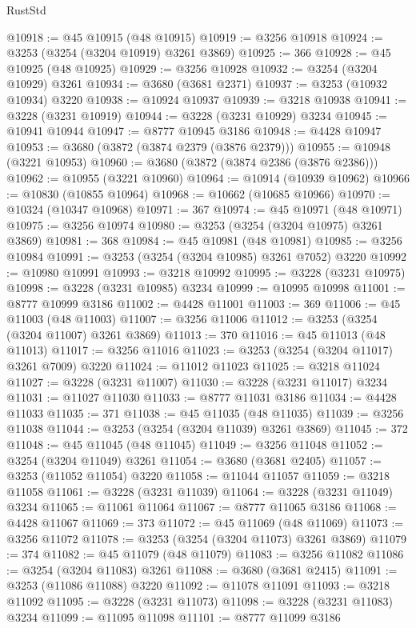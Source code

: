 \begin{lexlean}{RustStd}
\begin{coremodule}
@10918 := @45 @10915 (@48 @10915)
@10919 := @3256 @10918
@10924 := @3253 (@3254 (@3204 @10919) @3261 @3869)
@10925 := 366
@10928 := @45 @10925 (@48 @10925)
@10929 := @3256 @10928
@10932 := @3254 (@3204 @10929) @3261
@10934 := @3680 (@3681 @2371)
@10937 := @3253 (@10932 @10934) @3220
@10938 := @10924 @10937
@10939 := @3218 @10938
@10941 := @3228 (@3231 @10919)
@10944 := @3228 (@3231 @10929) @3234
@10945 := @10941 @10944
@10947 := @8777 @10945 @3186
@10948 := @4428 @10947
@10953 := @3680 (@3872 (@3874 @2379 (@3876 @2379)))
@10955 := @10948 (@3221 @10953)
@10960 := @3680 (@3872 (@3874 @2386 (@3876 @2386)))
@10962 := @10955 (@3221 @10960)
@10964 := @10914 (@10939 @10962)
@10966 := @10830 (@10855 @10964)
@10968 := @10662 (@10685 @10966)
@10970 := @10324 (@10347 @10968)
@10971 := 367
@10974 := @45 @10971 (@48 @10971)
@10975 := @3256 @10974
@10980 := @3253 (@3254 (@3204 @10975) @3261 @3869)
@10981 := 368
@10984 := @45 @10981 (@48 @10981)
@10985 := @3256 @10984
@10991 := @3253 (@3254 (@3204 @10985) @3261 @7052) @3220
@10992 := @10980 @10991
@10993 := @3218 @10992
@10995 := @3228 (@3231 @10975)
@10998 := @3228 (@3231 @10985) @3234
@10999 := @10995 @10998
@11001 := @8777 @10999 @3186
@11002 := @4428 @11001
@11003 := 369
@11006 := @45 @11003 (@48 @11003)
@11007 := @3256 @11006
@11012 := @3253 (@3254 (@3204 @11007) @3261 @3869)
@11013 := 370
@11016 := @45 @11013 (@48 @11013)
@11017 := @3256 @11016
@11023 := @3253 (@3254 (@3204 @11017) @3261 @7009) @3220
@11024 := @11012 @11023
@11025 := @3218 @11024
@11027 := @3228 (@3231 @11007)
@11030 := @3228 (@3231 @11017) @3234
@11031 := @11027 @11030
@11033 := @8777 @11031 @3186
@11034 := @4428 @11033
@11035 := 371
@11038 := @45 @11035 (@48 @11035)
@11039 := @3256 @11038
@11044 := @3253 (@3254 (@3204 @11039) @3261 @3869)
@11045 := 372
@11048 := @45 @11045 (@48 @11045)
@11049 := @3256 @11048
@11052 := @3254 (@3204 @11049) @3261
@11054 := @3680 (@3681 @2405)
@11057 := @3253 (@11052 @11054) @3220
@11058 := @11044 @11057
@11059 := @3218 @11058
@11061 := @3228 (@3231 @11039)
@11064 := @3228 (@3231 @11049) @3234
@11065 := @11061 @11064
@11067 := @8777 @11065 @3186
@11068 := @4428 @11067
@11069 := 373
@11072 := @45 @11069 (@48 @11069)
@11073 := @3256 @11072
@11078 := @3253 (@3254 (@3204 @11073) @3261 @3869)
@11079 := 374
@11082 := @45 @11079 (@48 @11079)
@11083 := @3256 @11082
@11086 := @3254 (@3204 @11083) @3261
@11088 := @3680 (@3681 @2415)
@11091 := @3253 (@11086 @11088) @3220
@11092 := @11078 @11091
@11093 := @3218 @11092
@11095 := @3228 (@3231 @11073)
@11098 := @3228 (@3231 @11083) @3234
@11099 := @11095 @11098
@11101 := @8777 @11099 @3186

\end{coremodule}
\end{lexlean}
